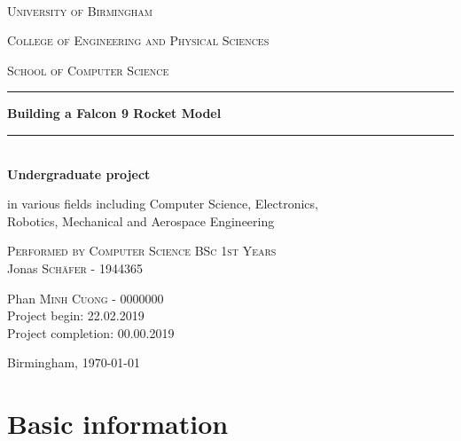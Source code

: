 \documentclass[a4paper,10pt]{article} %
\begin{document}
\thispagestyle{empty}
\newcommand{\Rule}{\rule{\textwidth}{1mm}}
\begin{center}
\ \\
\vspace{10mm}

\huge{\textsc{University of Birmingham}} \par
\vspace{7mm}
\Large{\textsc{College of Engineering and Physical Sciences}}\par
\vspace{2mm}
\Large{\textsc{School of Computer Science}}\par
\vspace{15mm}

\Rule
\vspace{11mm}
\huge\textbf{Building a Falcon 9 Rocket Model}\par
\vspace{9mm}
\Rule
\par
\ \\
\vspace{2mm}
\LARGE{\textbf{Undergraduate project}}\par
\vspace{4mm}
\large{in various fields including Computer Science, Electronics,\\ Robotics, Mechanical and Aerospace Engineering}


\vspace{12mm}

\textsc{Performed by Computer Science BSc 1st Years} \ \\
\vspace{3mm}
Jonas \textsc{Schäfer} - 1944365 \par
Phan \textsc{Minh Cuong} - 0000000
\vspace{5mm}
\\
Project begin: 22.02.2019 \\
Project completion: 00.00.2019
\vspace{15mm}

Birmingham, \today\par

\vspace{30mm}

\end{center}
\newpage
\tableofcontents

\newpage

\section{Basic information}
\end{document}
